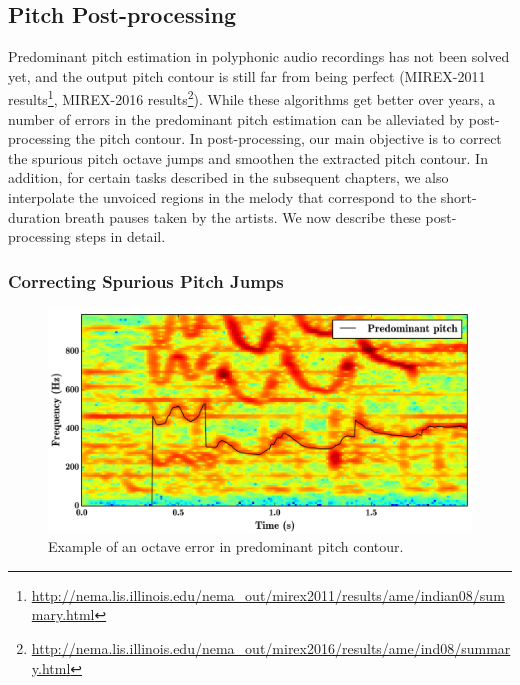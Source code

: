 {\subsection{Pitch Post-processing}
\label{sec:data_preprocessing_pitch_postprocessing}

Predominant pitch estimation in polyphonic audio recordings has not been solved yet, and the output pitch contour is still far from being perfect (MIREX-2011 results\footnote{\url{http://nema.lis.illinois.edu/nema_out/mirex2011/results/ame/indian08/summary.html}}, MIREX-2016 results\footnote{\url{http://nema.lis.illinois.edu/nema_out/mirex2016/results/ame/ind08/summary.html}}). While these algorithms get better over years, a number of errors in the predominant pitch estimation can be alleviated by post-processing the pitch contour. In post-processing, our main objective is to correct the spurious pitch octave jumps and smoothen the extracted pitch contour. In addition, for certain tasks described in the subsequent chapters, we also interpolate the unvoiced regions in the melody that correspond to the short-duration breath pauses taken by the artists. We now describe these post-processing steps in detail.

\subsubsection{Correcting Spurious Pitch Jumps}
\label{sec:data_processing_correcting_pitch_jumps}

\begin{figure}
	\begin{center}
		\includegraphics[width=\figSizeHundred]{ch05_preprocessing/figures/octaveErrorIllustration.png}
	\end{center}
	\caption{Example of an octave error in predominant pitch contour.}
	\label{fig:octave_error_pitch}
\end{figure}

}
